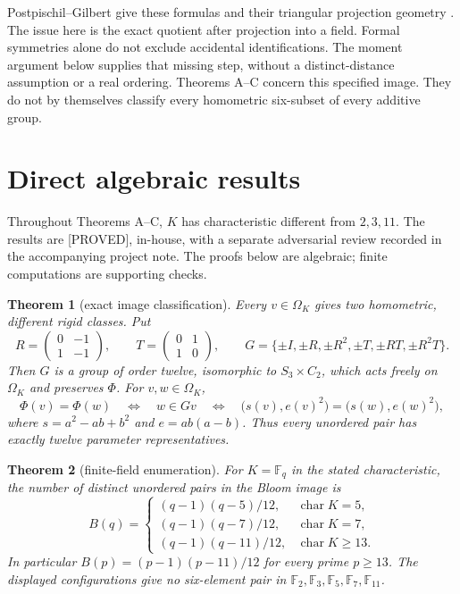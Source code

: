 \documentclass[11pt]{article}
\newtheorem{theorem}{Theorem}
\newcommand{\F}{\mathbb F}
\newcommand{\Om}{\Omega_K}
\newcommand{\status}[1]{\textsf{[#1]}}
\begin{document}
Postpischil--Gilbert give these formulas and their triangular projection
geometry \cite[\S\S3,7]{pg}. The issue here is the exact quotient after
projection into a field. Formal symmetries alone do not exclude accidental
identifications. The moment argument below supplies that missing step,
without a distinct-distance assumption or a real ordering. Theorems A--C
concern this specified image. They do not by themselves classify every
homometric six-subset of every additive group.

\newpage
\section{Direct algebraic results}
Throughout Theorems A--C, $K$ has characteristic different from $2,3,11$.
The results are \status{PROVED}, in-house, with a separate adversarial
review recorded in the accompanying project note. The proofs below are
algebraic; finite computations are supporting checks.

\begin{theorem}[exact image classification]\label{thm:A}
Every $v\in\Om$ gives two homometric, different rigid classes. Put
\[
 R=\begin{pmatrix}0&-1\\1&-1\end{pmatrix},\qquad
 T=\begin{pmatrix}0&1\\1&0\end{pmatrix},\qquad
 G=\{\pm I,\pm R,\pm R^2,\pm T,\pm RT,\pm R^2T\}.
\]
Then $G$ is a group of order twelve, isomorphic to $S_3\times C_2$,
which acts freely on $\Om$ and preserves $\Phi$. For $v,w\in\Om$,
\[
 \Phi(v)=\Phi(w)\quad\Longleftrightarrow\quad w\in Gv
 \quad\Longleftrightarrow\quad
 \bigl(s(v),e(v)^2\bigr)=\bigl(s(w),e(w)^2\bigr),
\]
where $s=a^2-ab+b^2$ and $e=ab(a-b)$.
Thus every unordered pair has exactly twelve parameter representatives.
\end{theorem}

\begin{theorem}[finite-field enumeration]\label{thm:B}
For $K=\F_q$ in the stated characteristic, the number of distinct
unordered pairs in the Bloom image is
\[
 B(q)=\begin{cases}
 (q-1)(q-5)/12,&\operatorname{char}K=5,\\[2pt]
 (q-1)(q-7)/12,&\operatorname{char}K=7,\\[2pt]
 (q-1)(q-11)/12,&\operatorname{char}K\ge13.
 \end{cases}
\]
In particular $B(p)=(p-1)(p-11)/12$ for every prime $p\ge13$.
The displayed configurations give no six-element pair in
$\F_2,\F_3,\F_5,\F_7,\F_{11}$.
\end{theorem}
\end{document}
